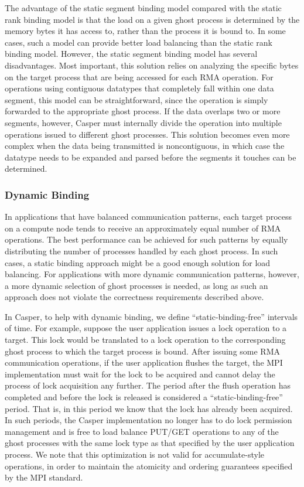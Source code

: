 The advantage of the static segment binding model compared with the
static rank binding model is that the load on a given ghost process is
determined by the memory bytes it has access to, rather than the
process it is bound to.  In some cases, such a model can provide
better load balancing than the static rank binding model.  However,
the static segment binding model
has several disadvantages.  Most important, this solution relies on
analyzing the specific bytes on the target process that are being
accessed for each RMA operation.  For operations using contiguous
datatypes that completely fall within one data segment, this model can
be straightforward, since the operation is simply forwarded to the
appropriate ghost process.  If the data overlaps two or more
segments, however, Casper must internally divide the operation into
multiple operations issued to different ghost processes.  This
solution becomes even more complex when the data being transmitted is
noncontiguous, in which case the datatype needs to be expanded and
parsed before the segments it touches can be determined.

\subsubsection{Dynamic Binding}  In applications that have balanced
communication patterns, each target process on a compute node tends to
receive an approximately equal number of RMA operations.  The best
performance can be achieved for such patterns by equally distributing
the number of processes handled by each ghost process.  In such cases,
a static binding approach might be a good enough solution for load
balancing.  For applications with more dynamic communication
patterns, however, a more dynamic selection of ghost processes is needed, as
long as such an approach does not violate the correctness requirements
described above.

In Casper, to help with dynamic binding, we define
``static-binding-free'' intervals of time.  For example, suppose the
user application issues a lock operation to a target. This lock would
be translated to a lock operation to the corresponding ghost process to
which the target process is bound.  After issuing some RMA communication
operations, if the user application flushes the target,
the MPI implementation must wait for the lock to be acquired
and cannot delay the process of lock acquisition any further.  The period after the
flush operation has completed and before the lock is released is
considered a ``static-binding-free'' period.  That is, in this period
we know that the lock has already been acquired.  In such periods, the
Casper implementation no longer has to do lock permission management
and is free to load balance PUT/GET operations to any of the ghost
processes with the same lock type as that specified by the user
application process.  We note that this optimization is not valid for
accumulate-style operations, in order to maintain the atomicity and
ordering guarantees specified by the MPI standard.

